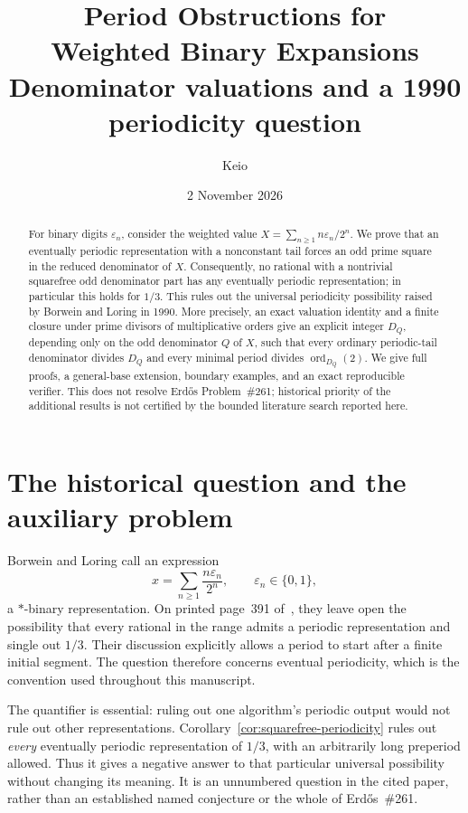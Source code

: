 \documentclass[11pt]{article}
\title{\textbf{Period Obstructions for\\Weighted Binary Expansions}\\[5pt]
\large Denominator valuations and a 1990 periodicity question}
\author{Keio}
\date{2 November 2026}
\theoremstyle{definition}
\theoremstyle{remark}
\DeclareMathOperator{\ord}{ord}
\begin{document}
\maketitle
\begin{abstract}
For binary digits $\varepsilon_n$, consider the weighted value
$X=\sum_{n\ge1}n\varepsilon_n/2^n$. We prove that an eventually periodic
representation with a nonconstant tail forces an odd prime square in the
reduced denominator of $X$. Consequently, no rational with a nontrivial
squarefree odd denominator part has any eventually periodic representation;
in particular this holds for $1/3$. This rules out the universal periodicity
possibility raised by Borwein and Loring in 1990. More precisely, an exact
valuation identity and a finite closure under prime divisors of
multiplicative orders give an explicit integer $D_Q$, depending only on
the odd denominator $Q$ of $X$, such that every ordinary periodic-tail
denominator divides $D_Q$ and every minimal period divides
$\ord_{D_Q}(2)$. We give full proofs, a general-base extension, boundary
examples, and an exact reproducible verifier. This does not resolve
Erd\H{o}s Problem~\#261; historical priority of the additional results is
not certified by the bounded literature search reported here.
\end{abstract}

\section{The historical question and the auxiliary problem}
Borwein and Loring call an expression
\begin{equation}\label{eq:weighted-def}
 x=\sum_{n\ge1}\frac{n\varepsilon_n}{2^n},\qquad
 \varepsilon_n\in\{0,1\},
\end{equation}
a $*$-binary representation. On printed page~391 of~\cite{BL1990}, they
leave open the possibility that every rational in the range admits a
periodic representation and single out $1/3$. Their discussion explicitly
allows a period to start after a finite initial segment. The question
therefore concerns eventual periodicity, which is the convention used
throughout this manuscript.

The quantifier is essential: ruling out one algorithm's periodic output
would not rule out other representations. Corollary~\ref{cor:squarefree-periodicity}
rules out \emph{every} eventually periodic representation of $1/3$, with
an arbitrarily long preperiod allowed. Thus it gives a negative answer
to that particular universal possibility without changing its meaning.
It is an unnumbered question in the cited paper, rather than an
established named conjecture or the whole of Erd\H{o}s~\#261.
\end{document}
